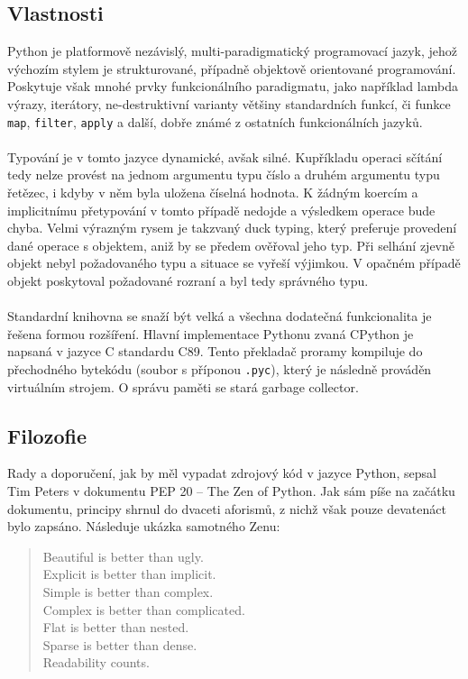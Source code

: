 \documentclass[
  field=inf,
  biblatex,
  glossaries,
  index
]{kidiplom}
\begin{document}
	\subsection{Vlastnosti}
	Python je platformově nezávislý, multi-paradigmatický programovací jazyk, jehož výchozím stylem je strukturované, případně objektově orientované programování. Poskytuje však mnohé prvky funkcionálního paradigmatu, jako například lambda výrazy, iterátory, ne-destruktivní varianty většiny standardních funkcí, či funkce \texttt{map}, \texttt{filter}, \texttt{apply} a další, dobře známé z ostatních funkcionálních jazyků.
	\\
	\\
	Typování je v tomto jazyce dynamické, avšak silné. Kupříkladu operaci sčítání tedy nelze provést na jednom argumentu typu číslo a druhém argumentu typu řetězec, i kdyby v něm byla uložena číselná hodnota. K žádným koercím a implicitnímu přetypování v tomto případě nedojde a výsledkem operace bude chyba. Velmi výrazným rysem je takzvaný duck typing, který preferuje provedení dané operace s objektem, aniž by se předem ověřoval jeho typ. Při selhání zjevně objekt nebyl požadovaného typu a situace se vyřeší výjimkou. V opačném případě objekt poskytoval požadované rozraní a byl tedy správného typu.
	\\
	\\
	Standardní knihovna se snaží být  velká a všechna dodatečná funkcionalita je řešena formou rozšíření. Hlavní implementace Pythonu zvaná CPython je napsaná v jazyce C standardu C89. Tento překladač proramy kompiluje do přechodného bytekódu (soubor s příponou \texttt{.pyc}), který je následně prováděn virtuálním strojem. O správu paměti se stará garbage collector.

	\subsection{Filozofie}
	Rady a doporučení, jak by měl vypadat zdrojový kód v jazyce Python, sepsal Tim Peters v dokumentu PEP 20 -- The Zen of Python. Jak sám píše na začátku dokumentu, principy shrnul do dvaceti aforismů, z nichž však pouze devatenáct bylo zapsáno. Následuje ukázka samotného Zenu:

	\begin{verse}
	Beautiful is better than ugly.\\
	Explicit is better than implicit.\\
	Simple is better than complex.\\
	Complex is better than complicated.\\
	Flat is better than nested.\\
	Sparse is better than dense.\\
	Readability counts.\\
	\end{verse}
\end{document}
